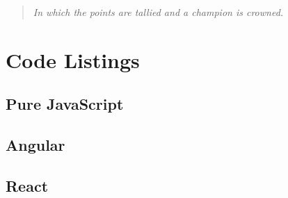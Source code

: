 \documentclass[12pt,letterpaper]{article}
\begin{document}
\begin{quote}
	\singlespacing
	\emph{In which the points are tallied and a champion is crowned.}
\end{quote}
















\newpage

\appendix
\section{Code Listings}
\label{app:code}

\subsection*{Pure JavaScript}




\newpage

\subsection*{Angular}




\newpage

\subsection*{React}
\end{document}
